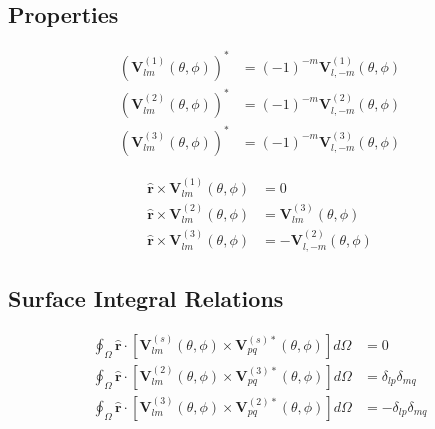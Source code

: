 \subsection{Properties}
%
\begin{subequations}
\begin{align}
\left( \boldsymbol{V}_{lm}^{(1)}(\theta, \phi) \right)^{*} &= (-1)^{-m} \boldsymbol{V}_{l,-m}^{(1)}(\theta, \phi)
\\
\left( \boldsymbol{V}_{lm}^{(2)}(\theta, \phi) \right)^{*} &= (-1)^{-m} \boldsymbol{V}_{l,-m}^{(2)}(\theta, \phi) 
\\
\left( \boldsymbol{V}_{lm}^{(3)}(\theta, \phi) \right)^{*} &= (-1)^{-m} \boldsymbol{V}_{l,-m}^{(3)}(\theta, \phi) 
\end{align}
\end{subequations}

\begin{subequations}
\begin{align}
\widehat{\boldsymbol{r}} \times \boldsymbol{V}_{lm}^{(1)}(\theta, \phi) &= 0
\\
\widehat{\boldsymbol{r}} \times \boldsymbol{V}_{lm}^{(2)}(\theta, \phi) &= \boldsymbol{V}_{lm}^{(3)}(\theta, \phi)
\\
\widehat{\boldsymbol{r}} \times \boldsymbol{V}_{lm}^{(3)}(\theta, \phi) &= - \boldsymbol{V}_{l,-m}^{(2)}(\theta, \phi) 
\end{align}
\end{subequations}

\subsection{Surface Integral Relations}
%
\begin{subequations}
\begin{align}
\oint_{\Omega} \widehat{\boldsymbol{r}} \cdot \left[ \boldsymbol{V}_{lm}^{(s)}(\theta, \phi) \times \boldsymbol{V}_{pq}^{(s)*}(\theta, \phi) \right] d\Omega
&= 0
\\
\oint_{\Omega} \widehat{\boldsymbol{r}} \cdot \left[ \boldsymbol{V}_{lm}^{(2)}(\theta, \phi) \times \boldsymbol{V}_{pq}^{(3)*}(\theta, \phi) \right] d\Omega
&= \delta_{lp} \delta_{mq}
\\
\oint_{\Omega} \widehat{\boldsymbol{r}} \cdot \left[ \boldsymbol{V}_{lm}^{(3)}(\theta, \phi) \times \boldsymbol{V}_{pq}^{(2)*}(\theta, \phi) \right] d\Omega
&= - \delta_{lp} \delta_{mq}
\end{align}
\end{subequations}

